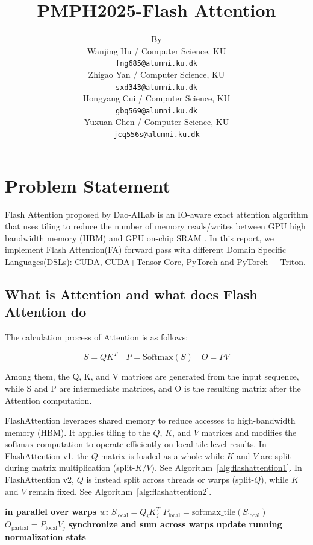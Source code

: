 \documentclass[11pt]{article}
\title{PMPH2025-Flash Attention}
\author{By \\
  Wanjing Hu / Computer Science, KU  \\
  \texttt{fng685@alumni.ku.dk} \\
  Zhigao Yan / Computer Science, KU  \\
  \texttt{sxd343@alumni.ku.dk} \\
  Hongyang Cui / Computer Science, KU  \\
  \texttt{gbq569@alumni.ku.dk} \\
  Yuxuan Chen / Computer Science, KU  \\
  \texttt{jcq556s@alumni.ku.dk} \\}
\renewcommand\cite{\citep}  %
\begin{document}
\maketitle

\section{Problem Statement}

Flash Attention proposed by Dao-AILab is an IO-aware exact attention algorithm that uses tiling to reduce the number of memory reads/writes between GPU high bandwidth memory (HBM) and GPU on-chip SRAM\cite{dao2022flashattention} \cite{dao2023flashattention}. In this report, we implement Flash Attention(FA) forward pass with different Domain Specific Languages(DSLs): CUDA, CUDA+Tensor Core, PyTorch and PyTorch + Triton.

\subsection{What is Attention and what does Flash Attention do}
The calculation process of Attention is as follows:

\[
S = QK^{T} \quad P = \text{Softmax}(S) \quad O = PV
\]

Among them, the Q, K, and V matrices are generated from the input sequence, while S and P are intermediate matrices, and O is the resulting matrix after the Attention computation.

FlashAttention leverages shared memory to reduce accesses to high-bandwidth memory (HBM). It applies tiling to the $Q$, $K$, and $V$ matrices and modifies the softmax computation to operate efficiently on local tile-level results. In FlashAttention v1, the $Q$ matrix is loaded as a whole while $K$ and $V$ are split  during matrix multiplication (split-$K/V$). See Algorithm~\ref{alg:flashattention1}. In FlashAttention v2, $Q$ is instead split across threads or warps (split-$Q$), while $K$ and $V$ remain fixed. See Algorithm~\ref{alg:flashattention2}.

\begin{algorithm}[htbp]
\caption{FlashAttention-1 (Split-K, Parallel over Warps)}
\label{alg:flashattention1}
\begin{algorithmic}[1]
    \STATE \textbf{in parallel over warps $w$:} 
    \STATE \hspace{0.5cm} $S_{\text{local}} = Q_i K_j^{T}$ 
    \STATE \hspace{0.5cm} $P_{\text{local}} = \text{softmax\_tile}(S_{\text{local}})$ 
    \STATE \hspace{0.5cm} $O_{\text{partial}} = P_{\text{local}} V_j$ 
    \STATE \textbf{synchronize and sum across warps} 
    \STATE \textbf{update running normalization stats} 
\ENDFOR
\end{algorithmic}
\end{algorithm}
\end{document}
